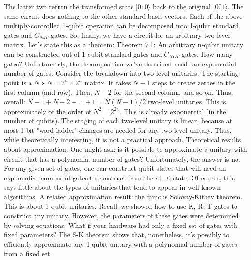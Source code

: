 \documentclass[main.tex]{subfiles}
\begin{document}
    The latter two return the transformed state $|010\rangle$ back to the original $|001\rangle$. The same circuit does nothing to the other standard-basis vectors. Each of the above multiply-controlled 1-qubit operation can be decomposed into 1-qubit standard gates and $C_{N o T}$ gates. So, finally, we have a circuit for an arbitrary two-level matrix. Let's state this as a theorem: Theorem 7.1: An arbitrary n-qubit unitary can be constructed out of 1-qubit standard gates and $C_{NOT}$ gates. How many gates? Unfortunately, the decomposition we've described needs an exponential number of gates. Consider the breakdown into two-level unitaries: The starting point is a $N \times N=2^{n} \times 2^{n}$ matrix. It takes $N-1$ steps to create zeroes in the first column (and row). Then, $N-2$ for the second column, and so on. Thus, overall: $N-1+N-2+\ldots+1=N(N-1) / 2$ two-level unitaries. This is approximately of the order of $N^{2}=2^{2 n}$. This is already exponential (in the number of qubits). The staging of each two-level unitary is linear, because at most 1-bit "word ladder" changes are needed for any two-level unitary. Thus, while theoretically interesting, it is not a practical approach. Theoretical results about approximation: One might ask: is it possible to approximate a unitary with circuit that has a polynomial number of gates? Unfortunately, the answer is no. For any given set of gates, one can construct qubit states that will need an exponential number of gates to construct from the all- 0 state. Of course, this says little about the types of unitaries that tend to appear in well-known algorithms. A related approximation result: the famous Solovay-Kitaev theorem. This is about 1-qubit unitaries. Recall: we showed how to use K, R, T gates to construct any unitary. However, the parameters of these gates were determined by solving equations. What if your hardware had only a fixed set of gates with fixed parameters? The S-K theorem shows that, nonetheless, it's possibly to efficiently approximate any 1-qubit unitary with a polynomial number of gates from a fixed set.
    
    
\end{document}
